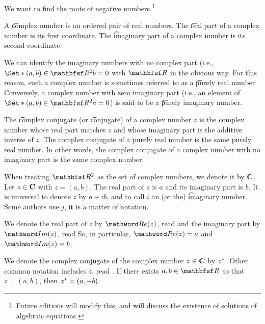 

We want to find the roots of negative numbers.\footnote{Future editions will modify this, and will discuss the existence of solutions of algebraic equations.}


A \t{complex number} is an ordered pair of real numbers.
The \t{real part} of a complex number is its first coordinate.
The \t{imaginary part} of a complex number is its second coordinate.

We can identify the imaginary numbers with no complex part (i.e., $\Set*{(a, b) \in \R^2}{b = 0}$ with $\R$ in the obvious way.
For this reason, such a complex number is sometimes referred to as a \t{purely real number}
Conversely, a complex number with zero imaginary part (i.e., an element of $\Set*{(a, b) \in \R^2}{a = 0}$) is said to be a \t{purely imaginary number}.

The \t{complex conjugate} (or \t{conjugate}) of a complex number $z$ is the complex number whose real part matches $z$ and whose imaginary part is the additive inverse of $z$.
The complex conjugate of a purely real number is the same purely real number.
In other words, the complex conjugate of a complex number with no imaginary part is the same complex number.


When treating $\R^2$ as the set of complex numbers, we denote it by $\mathbf{C}$.
Let $z \in \mathbf{C}$ with $z = (a, b)$.
The real part of $z$ is $a$ and its imaginary part is $b$.
It is universal to denote $z$ by $a + ib$, and to call $i$ an (or the) \t{imaginary number}.
Some authors use $j$, it is a matter of notation.

We denote the real part of $z$ by $\re(z)$, read  and the imaginary part by $\im(z)$, read 
So, in particular,  $\re(z) = a$ and $\im(z) = b$.

We denote the complex conjugate of the complex number $z \in \mathbf{C}$ by $z^{*}$.
Other common notation includes $\bar{z}$, read .
If there exists $a, b \in \R$ so that $z = (a, b)$, then $z^{*} = (a, -b)$.
